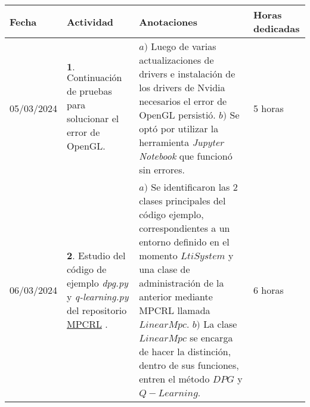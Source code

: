 \documentclass[12pt]{article}
\begin{document}
\begin{minipage}[h]{\textwidth}
	\centering
	\begin{tabularx}{\textwidth}{|p{2cm}|X|X|p{2cm}|} 
		\hline
		\rowcolor{encabezado}
		\textbf{Fecha} & 
		\textbf{Actividad} & 
		\textbf{Anotaciones} & 
		\textbf{Horas dedicadas} \\ \hline
		05/03/2024 & 
		$\mathbf{1}.$ Continuación de pruebas para solucionar el error de OpenGL. & 
		$a)$ Luego de varias actualizaciones de drivers e instalación de los drivers de Nvidia necesarios el error de OpenGL persistió. \newline 
		$b)$ Se optó por utilizar la herramienta \textit{Jupyter Notebook} que funcionó sin errores. \newline & 
		5 horas \\
	 	06/03/2024 & 
	 	$\mathbf{2}.$ Estudio del código de ejemplo \textit{dpg.py} y \textit{q-learning.py} del repositorio \href{https://github.com/FilippoAiraldi/mpc-reinforcement-learning/tree/main}{MPCRL} \cite{Airdaldi2023}. & 
	 	$a)$ Se identificaron las 2 clases principales del código ejemplo, correspondientes a un entorno definido en el momento $LtiSystem$ y una clase de administración de la anterior mediante MPCRL llamada $LinearMpc$. \newline
	 	$b)$ La clase $LinearMpc$ se encarga de hacer la distinción, dentro de sus funciones, entren el método $DPG$ y $Q-Learning$. \newline & 
	 	6 horas \\
	 	
	 	\hline
	\end{tabularx}
\end{minipage}	 	
	 	
\end{document}
